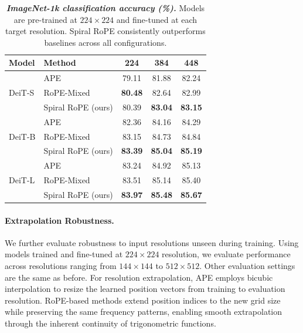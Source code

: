 \begin{table}[t]
    \caption{\textbf{\textit{ImageNet-1k classification accuracy (\%).}} Models are pre-trained at $224 \times 224$ and fine-tuned at each target resolution. Spiral RoPE consistently outperforms baselines across all configurations.}
    \label{tab:classification}
    \begin{center}
        \begin{small}
            \begin{sc}
                \begin{tabular}{llccc}
                    \toprule
                    Model & Method & 224 & 384 & 448 \\
                    \midrule
                    \multirow{3}{*}{DeiT-S} 
                    & APE & 79.11 & 81.88 & 82.24 \\
                    & RoPE-Mixed & \textbf{80.48} & 82.64 & 82.99 \\
                    & Spiral RoPE (ours) & 80.39 & \textbf{83.04} & \textbf{83.15} \\
                    \midrule
                    \multirow{3}{*}{DeiT-B} 
                    & APE & 82.36 & 84.16 & 84.29 \\
                    & RoPE-Mixed & 83.15 & 84.73 & 84.84 \\
                    & Spiral RoPE (ours) & \textbf{83.39} & \textbf{85.04} & \textbf{85.19} \\
                    \midrule
                    \multirow{3}{*}{DeiT-L} 
                    & APE & 83.24 & 84.92 & 85.13 \\
                    & RoPE-Mixed & 83.51 & 85.14 & 85.40 \\
                    & Spiral RoPE (ours) & \textbf{83.97} & \textbf{85.48} & \textbf{85.67} \\
                    \bottomrule
                \end{tabular}
            \end{sc}
        \end{small}
    \end{center}
    \vskip -0.1in
\end{table}

\paragraph{Extrapolation Robustness.} We further evaluate robustness to input resolutions unseen during training. Using models trained and fine-tuned at $224 \times 224$ resolution, we evaluate performance across resolutions ranging from $144 \times 144$ to $512 \times 512$. Other evaluation settings are the same as before. For resolution extrapolation, APE employs bicubic interpolation to resize the learned position vectors from training to evaluation resolution. RoPE-based methods extend position indices to the new grid size while preserving the same frequency patterns, enabling smooth extrapolation through the inherent continuity of trigonometric functions.

